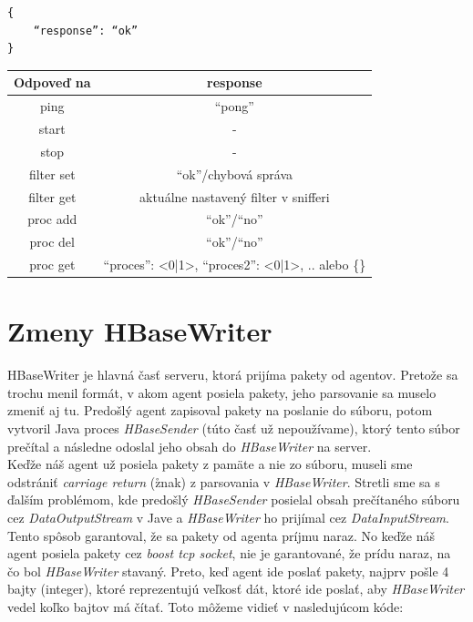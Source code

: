 \documentclass[a4paper,12pt]{article}
\begin{document}
\begin{lstlisting}
{
	“response”: “ok” 
}
\end{lstlisting}


\begin{table}[h!]
	\centering
	\begin{tabular}{|c|c|}
		\hline
		\textbf{Odpoveď na} & \textbf{response}  \\
		\hline
		ping & ``pong'' \\
		\hline
		start & - \\
		\hline
		stop & - \\
		\hline
		filter set &  ``ok''/chybová správa   \\
		\hline
		filter get &  aktuálne nastavený filter v snifferi   \\
		\hline
		proc add &  ``ok''/``no'' \\
		\hline
		proc del &  ``ok''/``no'' \\
		\hline
		proc get &  {“proces”: <0|1>, “proces2”: <0|1>, ..} alebo \{\} \\
		\hline
		
	\end{tabular}
	\label{Tab:1}
\end{table}

\section{Zmeny HBaseWriter} 
HBaseWriter je hlavná časť serveru, ktorá prijíma pakety od agentov. Pretože sa trochu menil formát, v akom agent posiela pakety, jeho parsovanie sa muselo zmeniť aj tu. Predošlý agent zapisoval pakety na poslanie do súboru, potom vytvoril Java proces \textit{HBaseSender} (túto časť už nepoužívame), ktorý tento súbor prečítal a následne odoslal jeho obsah do \textit{HBaseWriter} na server. \\
	
Keďže náš agent už posiela pakety z pamäte a nie zo súboru, museli sme odstrániť \textit{carriage return} (\r znak) z parsovania v \textit{HBaseWriter}. Stretli sme sa s ďalším problémom, kde predošlý \textit{HBaseSender} posielal obsah prečítaného súboru cez \textit{DataOutputStream} v Jave a \textit{HBaseWriter} ho prijímal cez \textit{DataInputStream}. Tento spôsob garantoval, že sa pakety od agenta príjmu naraz. No keďže náš agent posiela pakety cez \textit{boost tcp socket}, nie je garantované, že prídu naraz, na čo bol \textit{HBaseWriter} stavaný. Preto, keď agent ide poslať pakety, najprv pošle 4 bajty (integer), ktoré reprezentujú veľkosť dát, ktoré ide poslať, aby \textit{HBaseWriter} vedel koľko bajtov má čítať. Toto môžeme vidieť v nasledujúcom kóde:
\end{document}
